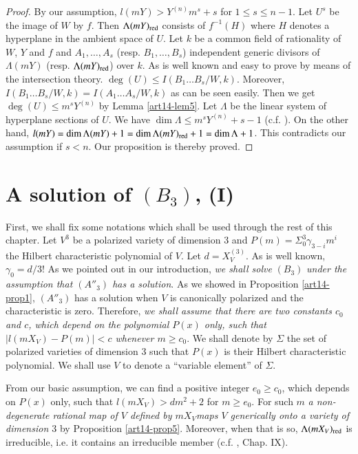 \begin{proof}
By our assumption, $l(mY)>Y^{(n)}m^{s}+s$ for $1\leq s\leq n-1$. Let $U^{s}$ be the image of $W$ by $f$. Then $\Lambda(mY)_{\operatorname{\mathrm{red}}}$ consists of $f^{-1}(H)$ where $H$ denotes a hyperplane in the ambient space of $U$. Let $k$ be a common field of rationality of $W$, $Y$ and $f$ and $A_{1},\ldots,A_{s}$ (resp. $B_{1},\ldots,B_{s}$) independent generic divisors of $\Lambda(mY)$ (resp. $\Lambda(mY)_{\operatorname{\mathrm{red}}}$) over $k$. As is well known and easy to prove by means of the intersection theory. $\deg(U)\leq I(B_{1}\ldots B_{s}/W,k)$. Moreover, $I(B_{1}\ldots B_{s}/W,k)=I(A_{1}\ldots A_{s}/W,k)$ as can be seen easily. Then we get $\deg (U)\leq m^{s}Y^{(n)}$ by Lemma \ref{art14-lem5}. Let $\Lambda$ be the linear system of hyperplane sections of $U$. We have $\dim \Lambda \leq m^{s}Y^{(n)}+s-1$ (c.f. \cite{art14-key17}). On the other hand, $l(mY)=\dim \Lambda (mY)+1=\dim \Lambda(mY)_{\operatorname{\mathrm{red}}}+1=\dim \Lambda +1$. This contradicts our assumption if $s<n$. Our proposition is thereby proved.
\end{proof}

\section{A solution of \texorpdfstring{$(B_{3})$}{B3}, (I)}\label{art14-sec5}

First, we shall fix some notations which shall be used through the rest of this chapter. Let $V^{3}$ be a polarized variety of dimension 3 and $P(m)=\Sigma^{3}_{0}\gamma_{3-i}m^{i}$ the Hilbert characteristic polynomial of $V$. Let $d=X^{(3)}_{V}$. As is well known, $\gamma_{0}=d/3$! As we pointed out in our introduction, {\em we shall solve} $(B_{3})$ {\em under the assumption that $(A''_{3})$ has a solution}. As we showed in Proposition \ref{art14-prop1}, $(A''_{3})$ has a solution when $V$ is canonically polarized and the characteristic is zero. Therefore, {\em we shall assume that there are two constants $c_{0}$ and $c$, which depend on the polynomial $P(x)$ only, such that $|l(mX_{V})-P(m)|<c$ whenever $m\geq c_{0}$}. We shall denote by $\Sigma$ the set of polarized varieties of dimension 3 such that $P(x)$ is their Hilbert characteristic polynomial. We shall use $V$ to denote a ``variable element'' of $\Sigma$.

From our basic assumption, we can find a positive integer $e_{0}\geq c_{0}$, which depends on $P(x)$ only, such that $l(mX_{V})>dm^{2}+2$ for $m\geq e_{0}$. For such $m$ {\em a non-degenerate rational map of $V$ defined by $mX_{V}$\pageoriginale maps $V$ generically onto a variety of dimension $3$} by Proposition \ref{art14-prop5}. Moreover, when that is so, $\Lambda(mX_{V})_{\operatorname{\mathrm{red}}}$ is irreducible, i.e. it contains an irreducible member (c.f. \cite{art14-key25}, Chap. IX).

